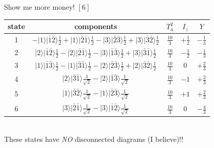 \documentclass{beamer}
\begin{document}
\begin{frame}{Show me more money!}
\footnotesize
\center
$[6]$\\
\tiny
\begin{tabular}{c|c|c|c|c}
state&components& $T_a^2$ & $I_z$ & $Y$\\
\hline\hline
1& $-|1\rangle|\bar{1}\bar{2}\rangle\frac{1}{2}+|1\rangle|\bar{2}\bar{1}\rangle\frac{1}{2}-|3\rangle|\bar{2}\bar{3}\rangle\frac{1}{2}+|3\rangle|\bar{3}\bar{2}\rangle\frac{1}{2}$ &$\frac{10}{3}$ &$+\frac{1}{2}$ & $-\frac{1}{3}$\\
2& $|2\rangle|\bar{1}\bar{2}\rangle\frac{1}{2}-|2\rangle|\bar{2}\bar{1}\rangle\frac{1}{2}-|3\rangle|\bar{1}\bar{3}\rangle\frac{1}{2}+|3\rangle|\bar{3}\bar{1}\rangle\frac{1}{2}$ &$\frac{10}{3}$ &$-\frac{1}{2}$ & $-\frac{1}{3}$\\
\hline
3& $|1\rangle|\bar{1}\bar{3}\rangle\frac{1}{2}-|1\rangle|\bar{3}\bar{1}\rangle\frac{1}{2}-|2\rangle|\bar{2}\bar{3}\rangle\frac{1}{2}+|2\rangle|\bar{3}\bar{2}\rangle\frac{1}{2}$ &$\frac{10}{3}$ &0 & $+\frac{2}{3}$\\
4& $|2\rangle|\bar{3}\bar{1}\rangle\frac{1}{\sqrt{2}}-|2\rangle|\bar{1}\bar{3}\rangle\frac{1}{\sqrt{2}}$ &$\frac{10}{3}$ &$-1$ & $+\frac{2}{3}$\\
5& $|1\rangle|\bar{3}\bar{2}\rangle\frac{1}{\sqrt{2}}-|1\rangle|\bar{2}\bar{3}\rangle\frac{1}{\sqrt{2}}$ &$\frac{10}{3}$ &$+1$ & $+\frac{2}{3}$\\
\hline
6& $|3\rangle|\bar{2}\bar{1}\rangle\frac{1}{\sqrt{2}}-|3\rangle|\bar{1}\bar{2}\rangle\frac{1}{\sqrt{2}}$ &$\frac{10}{3}$ &0 & $-\frac{4}{3}$\\
\hline\hline
\end{tabular}\\
{\color{blue} These states have \emph{NO} disconnected diagrams (I believe)!!}
\end{frame}
\end{document}
